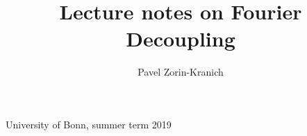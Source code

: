 \documentclass[11pt,oneside]{article}
\begin{document}
\setcounter{section}{-1}

\title{Lecture notes on Fourier Decoupling}
\author{Pavel Zorin-Kranich}
\maketitle
\begin{center}
University of Bonn, summer term 2019
\end{center}
\tableofcontents











\appendix




\printbibliography[heading=bibintoc]
\end{document}
